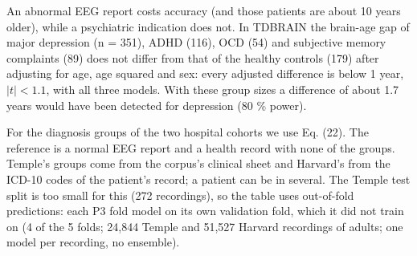 \documentclass[11pt,a4paper]{article}
\begin{document}
An abnormal EEG report costs accuracy (and those patients are about 10 years older), while a psychiatric indication does not. In TDBRAIN the brain-age gap of major depression (n = 351), ADHD (116), OCD (54) and subjective memory complaints (89) does not differ from that of the healthy controls (179) after adjusting for age, age squared and sex: every adjusted difference is below 1 year, $\lvert t \rvert < 1.1$, with all three models. With these group sizes a difference of about 1.7 years would have been detected for depression (80 \% power).

For the diagnosis groups of the two hospital cohorts we use Eq. (22). The reference is a normal EEG report and a health record with none of the groups. Temple's groups come from the corpus's clinical sheet and Harvard's from the ICD-10 codes of the patient's record; a patient can be in several. The Temple test split is too small for this (272 recordings), so the table uses out-of-fold predictions: each P3 fold model on its own validation fold, which it did not train on (4 of the 5 folds; 24,844 Temple and 51,527 Harvard recordings of adults; one model per recording, no ensemble).
\end{document}
